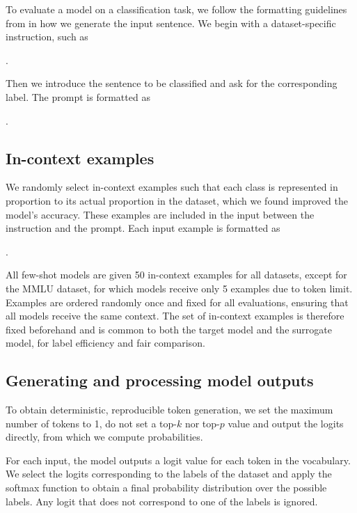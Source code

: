 To evaluate a model on a classification task, we follow the formatting guidelines from \citet{kossen2024context} in how we generate the input sentence.
We begin with a dataset-specific instruction, such as

.

Then we introduce the sentence to be classified and ask for the corresponding label.
The prompt is formatted as

.


\subsection{In-context examples}

We randomly select in-context examples such that each class is represented in proportion to its actual proportion in the dataset, which we found improved the model's accuracy. These examples are included in the input between the instruction and the prompt. Each input example is formatted as

.

All few-shot models are given 50 in-context examples for all datasets, except for the MMLU dataset, for which models receive only 5 examples due to token limit.
Examples are ordered randomly once and fixed for all evaluations, ensuring that all models receive the same context.
The set of in-context examples is therefore fixed beforehand and is common to both the target model and the surrogate model, for label efficiency and fair comparison.


\subsection{Generating and processing model outputs}

To obtain deterministic, reproducible token generation, we set the maximum number of tokens to 1, do not set a top-$k$ nor top-$p$ value and output the logits directly, from which we compute probabilities.

For each input, the model outputs a logit value for each token in the vocabulary.
We select the logits corresponding to the labels of the dataset and apply the softmax function to obtain a final probability distribution over the possible labels.
Any logit that does not correspond to one of the labels is ignored.


